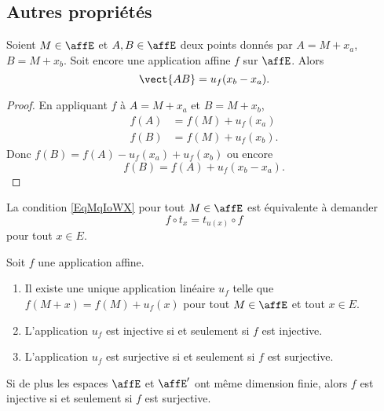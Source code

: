 \subsection{Autres propriétés}

\begin{lemma}       \label{LEMooXXTPooKYFGGM}
    Soient \( M\in \affE\) et \( A,B\in \affE\) deux points donnés par \( A=M+x_a\), \( B=M+x_b\). Soit encore une application affine \( f\) sur \( \affE\). Alors
    \begin{equation}
        \vect{ AB }=u_f(x_b-x_a).
    \end{equation}
\end{lemma}

\begin{proof}
    En appliquant \( f\) à \( A=M+x_a\) et \( B=M+x_b\),
    \begin{subequations}
        \begin{align}
            f(A)&=f(M)+u_f(x_a)\\
            f(B)&=f(M)+u_f(x_b).
        \end{align}
    \end{subequations}
    Donc \( f(B)=f(A)-u_f(x_a)+u_f(x_b)\) ou encore
    \begin{equation}
        f(B)=f(A)+u_f(x_b-x_a).
    \end{equation}
\end{proof}

\begin{remark}
    La condition \eqref{EqMqIoWX} pour tout \( M\in\affE\) est équivalente à demander
    \begin{equation}
        f\circ t_x=t_{u(x)}\circ f
    \end{equation}
    pour tout \( x\in E\).
\end{remark}

\begin{proposition}     \label{PROPooALXYooHoMdqQ}
    Soit \( f\) une application affine.
    \begin{enumerate}
        \item       \label{ITEMooSKCYooHyRZYN}
            Il existe une unique application linéaire \( u_f\) telle que \( f(M+x)=f(M)+u_f(x)\) pour tout \( M\in \affE\) et tout \( x\in E\).
        \item
            L'application \( u_f\) est injective si et seulement si \( f\) est injective.
        \item
            L'application \( u_f\) est surjective si et seulement si \( f\) est surjective.
    \end{enumerate}
    Si de plus les espaces \( \affE\) et \( \affE'\) ont même dimension finie, alors \( f\) est injective si et seulement si \( f\) est surjective.
\end{proposition}


